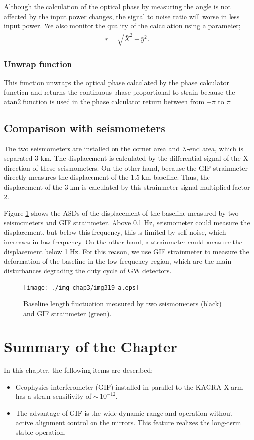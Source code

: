 Although the calculation of the optical phase by measuring the angle is not affected by the input power changes, the signal to noise ratio will worse in less input power. We also monitor the quality of the calculation using a parameter;
\begin{eqnarray}
  r = \sqrt{\bar{X}^2+{\bar{y}^2}}.
\end{eqnarray}

\subsubsection{Unwrap function}
This function unwraps the optical phase calculated by the phase calculator function and returns the continuous phase proportional to strain because the atan2 function is used in the phase calculator return between from $-\pi$ to $\pi$. 

\subsection{Comparison with seismometers}
The two seismometers are installed on the corner area and X-end area, which is separated 3 km. The displacement is calculated by the differential signal of the X direction of these seismometers. On the other hand, because the GIF strainmeter directly measures the displacement of the 1.5 km baseline. Thus, the displacement of the 3 km is calculated by this strainmeter signal multiplied factor 2.

Figure \ref{img:img319_a} shows the ASDs of the displacement of the baseline measured by two seismometers and GIF strainmeter. Above 0.1 Hz, seismometer could measure the displacement, but below this frequency, this is limited by self-noise, which increases in low-frequency. On the other hand, a strainmeter could measure the displacement below 1 Hz. For this reason, we use GIF strainmeter to measure the deformation of the baseline in the low-frequency region, which are the main disturbances degrading the duty cycle of GW detectors.

\begin{figure}[h]
    \begin{center}   
      \texttt{[image: ./img\_chap3/img319\_a.eps]}
      \caption{Baseline length fluctuation measured by two seismometers (black) and GIF strainmeter (green).}\label{img:img319_a}
    \end{center}
\end{figure}



\section{Summary of the Chapter} 
In this chapter, the following items are described:
\begin{itemize}
\item Geophysics interferometer (GIF) installed in parallel to the KAGRA X-arm has a strain sensitivity of $\sim\,10^{-12}$.
\item The advantage of GIF is the wide dynamic range and operation without active alignment control on the mirrors. This feature realizes the long-term stable operation.
\end{itemize}
